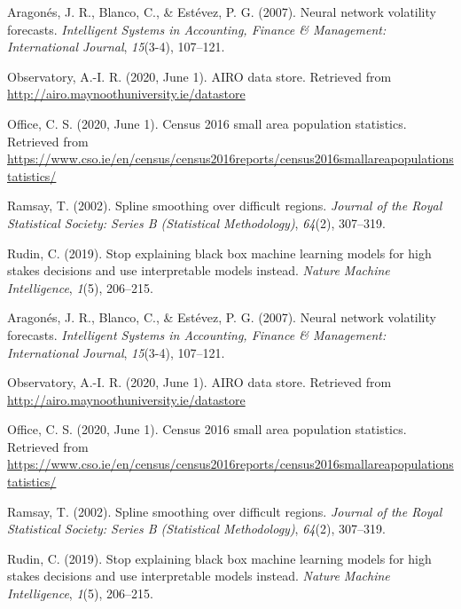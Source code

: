 \documentclass[]{article}
\newlength{\cslhangindent}
\newenvironment{cslreferences}%
  {\setlength{\parindent}{0pt}%
  \everypar{\setlength{\hangindent}{\cslhangindent}}\ignorespaces}%
  {\par}
\begin{document}
\hypertarget{refs}{}
\begin{cslreferences}
\leavevmode\hypertarget{ref-aragones2007neural}{}%
Aragonés, J. R., Blanco, C., \& Estévez, P. G. (2007). Neural network volatility forecasts. \emph{Intelligent Systems in Accounting, Finance \& Management: International Journal}, \emph{15}(3-4), 107--121.

\leavevmode\hypertarget{ref-airo2020}{}%
Observatory, A.-I. R. (2020, June 1). AIRO data store. Retrieved from \url{http://airo.maynoothuniversity.ie/datastore}

\leavevmode\hypertarget{ref-cso2020}{}%
Office, C. S. (2020, June 1). Census 2016 small area population statistics. Retrieved from \url{https://www.cso.ie/en/census/census2016reports/census2016smallareapopulationstatistics/}

\leavevmode\hypertarget{ref-ramsay2002spline}{}%
Ramsay, T. (2002). Spline smoothing over difficult regions. \emph{Journal of the Royal Statistical Society: Series B (Statistical Methodology)}, \emph{64}(2), 307--319.

\leavevmode\hypertarget{ref-rudin2019stop}{}%
Rudin, C. (2019). Stop explaining black box machine learning models for high stakes decisions and use interpretable models instead. \emph{Nature Machine Intelligence}, \emph{1}(5), 206--215.

\leavevmode\hypertarget{ref-aragones2007neural}{}%
Aragonés, J. R., Blanco, C., \& Estévez, P. G. (2007). Neural network volatility forecasts. \emph{Intelligent Systems in Accounting, Finance \& Management: International Journal}, \emph{15}(3-4), 107--121.

\leavevmode\hypertarget{ref-airo2020}{}%
Observatory, A.-I. R. (2020, June 1). AIRO data store. Retrieved from \url{http://airo.maynoothuniversity.ie/datastore}

\leavevmode\hypertarget{ref-cso2020}{}%
Office, C. S. (2020, June 1). Census 2016 small area population statistics. Retrieved from \url{https://www.cso.ie/en/census/census2016reports/census2016smallareapopulationstatistics/}

\leavevmode\hypertarget{ref-ramsay2002spline}{}%
Ramsay, T. (2002). Spline smoothing over difficult regions. \emph{Journal of the Royal Statistical Society: Series B (Statistical Methodology)}, \emph{64}(2), 307--319.

\leavevmode\hypertarget{ref-rudin2019stop}{}%
Rudin, C. (2019). Stop explaining black box machine learning models for high stakes decisions and use interpretable models instead. \emph{Nature Machine Intelligence}, \emph{1}(5), 206--215.
\end{cslreferences}
\end{document}
